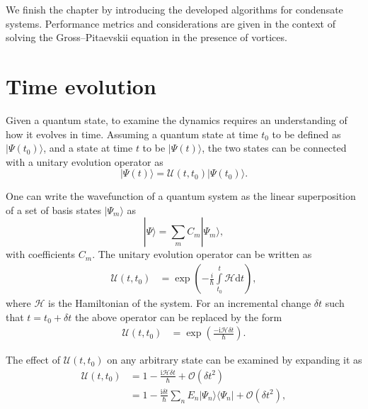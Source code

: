 We finish the chapter by introducing the developed algorithms for condensate systems. Performance metrics and considerations are given in the context of solving the Gross--Pitaevskii equation in the presence of vortices.

\section{Time evolution}\label{sec:timeev}
Given a quantum state, to examine the dynamics requires an understanding of how it evolves in time. Assuming a quantum state at time $t_0$ to be defined as $|\Psi(t_0) \rangle$, and a state at time $t$ to be $|\Psi(t) \rangle$, the two states can be connected with a unitary evolution operator as
\begin{equation}
    |\Psi(t) \rangle = \mathscr{U}(t,t_0) | \Psi(t_0) \rangle.
\end{equation}

One can write the wavefunction of a quantum system as the linear superposition of a set of basis states $|\Psi_m\rangle$ as
\begin{equation}\label{eqn:psicomplete}
    |\Psi \rangle = \displaystyle\sum\limits_{m} C_m |\Psi_m \rangle,
\end{equation}
with coefficients $C_m$. The unitary evolution operator can be written as
\begin{align}
   \mathscr{U}(t,t_0) &= \exp\left(-\frac{i}{\hbar}\displaystyle\int\limits_{t_0}^{t}\mathcal{H}\text{d}t\right),
\end{align}
where $\mathcal{H}$ is the Hamiltonian of the system. For an incremental change $\delta t$ such that $t = t_0 +\delta t$ the above operator can be replaced by the form
\begin{align}\label{eqn:timev_dt}
   \mathscr{U}(t,t_0) &= \exp\left(\frac{-\text{i}\mathcal{H}\delta t}{\hbar}\right).
\end{align}

The effect of $\mathscr{U}(t,t_0)$ on any arbitrary state can be examined by expanding it as
\begin{subequations}
    \begin{align}
        \mathscr{U}(t,t_0) &= 1 - \frac{\textrm{i}\mathcal{H}\delta t}{\hbar} + \mathcal{O}(\delta t^2) \\
        &= 1 - \frac{\textrm{i}\delta t}{\hbar}{\displaystyle\sum\limits_{n} E_n |\Psi_n\rangle \langle \Psi_n |} + \mathcal{O}(\delta t^2),
    \end{align}
\end{subequations}

